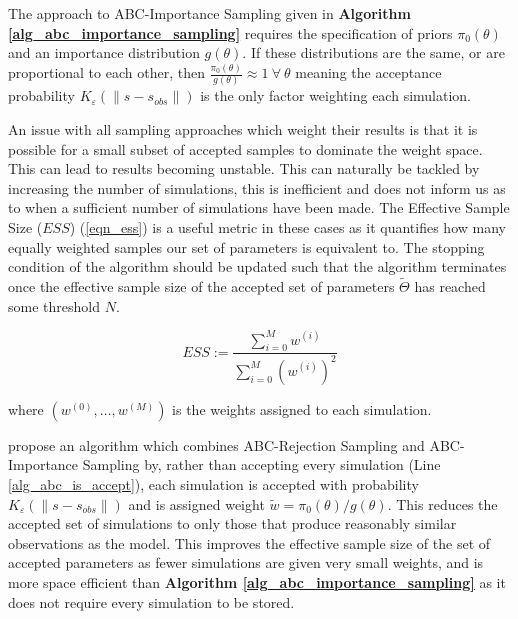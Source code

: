 \documentclass[11pt,a4paper]{article}
\theoremstyle{break}
\begin{document}
  \par The approach to ABC-Importance Sampling given in \textbf{Algorithm \ref{alg_abc_importance_sampling}} requires the specification of priors $\pi_0(\theta)$ and an importance distribution $g(\theta)$. If these distributions are the same, or are proportional to each other, then $\frac{\pi_0(\theta)}{g(\theta)}\approx 1\ \forall\ \theta$ meaning the acceptance probability $K_\varepsilon(\|s-s_{obs}\|)$ is the only factor weighting each simulation.

  \par An issue with all sampling approaches which weight their results is that it is possible for a small subset of accepted samples to dominate the weight space. This can lead to results becoming unstable. This can naturally be tackled by increasing the number of simulations, this is inefficient and does not inform us as to when a sufficient number of simulations have been made. The Effective Sample Size ($ESS$) (\ref{eqn_ess}) is a useful metric in these cases as it quantifies how many equally weighted samples our set of parameters is equivalent to. The stopping condition of the algorithm should be updated such that the algorithm terminates once the effective sample size of the accepted set of parameters $\tilde\Theta$ has reached some threshold $N$.

  \begin{equation}\label{eqn_ess}
    ESS:=\frac{\sum_{i=0}^M w^{(i)}}{\sum_{i=0}^M \left(w^{(i)}\right)^2}
  \end{equation}

  \noindent where $(w^{(0)},\dots,w^{(M)})$ is the weights assigned to each simulation.

  \par \cite[]{constructing_summary_statistics_for_approximate_bayesian_computation_semi_automatic_ABC} propose an algorithm which combines ABC-Rejection Sampling and ABC-Importance Sampling by, rather than accepting every simulation (Line \ref{alg_abc_is_accept}), each simulation is accepted with probability $K_\varepsilon(\|s-s_{obs}\|)$ and is assigned weight $\tilde{w}=\pi_0(\theta)/g(\theta)$. This reduces the accepted set of simulations to only those that produce reasonably similar observations as the model. This improves the effective sample size of the set of accepted parameters as fewer simulations are given very small weights, and is more space efficient than \textbf{Algorithm \ref{alg_abc_importance_sampling}} as it does not require every simulation to be stored.
\end{document}
